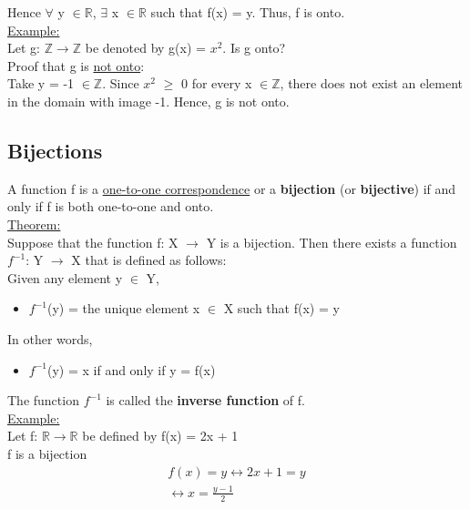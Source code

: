 \documentclass{article}
\begin{document}
Hence $\forall$ y $\in \mathbb{R}$, $\exists$ x $\in \mathbb{R}$ such that f(x) = y. Thus, f is onto. \\

\underline{Example:} \\
Let g: $\mathbb{Z} \longrightarrow \mathbb{Z}$ be denoted by g(x) = $x^{2}$. Is g onto? \\

Proof that g is \underline{not onto}: \\
Take y = -1 $\in \mathbb{Z}$. Since $x^{2}$ $\geq$ 0 for every x $\in\mathbb{Z}$, there does not exist an element in the domain with image -1. Hence, g is not onto.

\subsection{Bijections}

A function f is a \underline{one-to-one correspondence} or a \textbf{bijection} (or \textbf{bijective}) if and only if f is both one-to-one and onto. \\

\underline{Theorem:} \\

Suppose that the function f: X $\longrightarrow$ Y is a bijection. Then there exists a function $f^{-1}$: Y $\longrightarrow$ X that is defined as follows: \\

Given any element y $\in$ Y,
\begin{itemize}
\item $f^{-1}$(y) = the unique element x $\in$ X such that f(x) = y
\end{itemize}

In other words,
\begin{itemize}
\item $f^{-1}$(y) = x if and only if y = f(x)
\end{itemize}

The function $f^{-1}$ is called the \textbf{inverse function} of f. \\

\underline{Example:} \\
Let f: $\mathbb{R} \longrightarrow \mathbb{R}$ be defined by f(x) = 2x + 1\\
f is a bijection \\
\begin{align}
f(x) = y \leftrightarrow 2x + 1 = y \\
\leftrightarrow x = \frac{y-1}{2}
\end{align}
\end{document}
